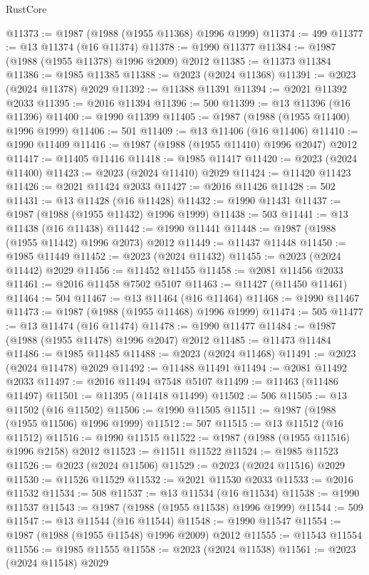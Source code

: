 \begin{lexlean}{RustCore}
\begin{coremodule}
@11373 := @1987 (@1988 (@1955 @11368) @1996 @1999)
@11374 := 499
@11377 := @13 @11374 (@16 @11374)
@11378 := @1990 @11377
@11384 := @1987 (@1988 (@1955 @11378) @1996 @2009) @2012
@11385 := @11373 @11384
@11386 := @1985 @11385
@11388 := @2023 (@2024 @11368)
@11391 := @2023 (@2024 @11378) @2029
@11392 := @11388 @11391
@11394 := @2021 @11392 @2033
@11395 := @2016 @11394
@11396 := 500
@11399 := @13 @11396 (@16 @11396)
@11400 := @1990 @11399
@11405 := @1987 (@1988 (@1955 @11400) @1996 @1999)
@11406 := 501
@11409 := @13 @11406 (@16 @11406)
@11410 := @1990 @11409
@11416 := @1987 (@1988 (@1955 @11410) @1996 @2047) @2012
@11417 := @11405 @11416
@11418 := @1985 @11417
@11420 := @2023 (@2024 @11400)
@11423 := @2023 (@2024 @11410) @2029
@11424 := @11420 @11423
@11426 := @2021 @11424 @2033
@11427 := @2016 @11426
@11428 := 502
@11431 := @13 @11428 (@16 @11428)
@11432 := @1990 @11431
@11437 := @1987 (@1988 (@1955 @11432) @1996 @1999)
@11438 := 503
@11441 := @13 @11438 (@16 @11438)
@11442 := @1990 @11441
@11448 := @1987 (@1988 (@1955 @11442) @1996 @2073) @2012
@11449 := @11437 @11448
@11450 := @1985 @11449
@11452 := @2023 (@2024 @11432)
@11455 := @2023 (@2024 @11442) @2029
@11456 := @11452 @11455
@11458 := @2081 @11456 @2033
@11461 := @2016 @11458 @7502 @5107
@11463 := @11427 (@11450 @11461)
@11464 := 504
@11467 := @13 @11464 (@16 @11464)
@11468 := @1990 @11467
@11473 := @1987 (@1988 (@1955 @11468) @1996 @1999)
@11474 := 505
@11477 := @13 @11474 (@16 @11474)
@11478 := @1990 @11477
@11484 := @1987 (@1988 (@1955 @11478) @1996 @2047) @2012
@11485 := @11473 @11484
@11486 := @1985 @11485
@11488 := @2023 (@2024 @11468)
@11491 := @2023 (@2024 @11478) @2029
@11492 := @11488 @11491
@11494 := @2081 @11492 @2033
@11497 := @2016 @11494 @7548 @5107
@11499 := @11463 (@11486 @11497)
@11501 := @11395 (@11418 @11499)
@11502 := 506
@11505 := @13 @11502 (@16 @11502)
@11506 := @1990 @11505
@11511 := @1987 (@1988 (@1955 @11506) @1996 @1999)
@11512 := 507
@11515 := @13 @11512 (@16 @11512)
@11516 := @1990 @11515
@11522 := @1987 (@1988 (@1955 @11516) @1996 @2158) @2012
@11523 := @11511 @11522
@11524 := @1985 @11523
@11526 := @2023 (@2024 @11506)
@11529 := @2023 (@2024 @11516) @2029
@11530 := @11526 @11529
@11532 := @2021 @11530 @2033
@11533 := @2016 @11532
@11534 := 508
@11537 := @13 @11534 (@16 @11534)
@11538 := @1990 @11537
@11543 := @1987 (@1988 (@1955 @11538) @1996 @1999)
@11544 := 509
@11547 := @13 @11544 (@16 @11544)
@11548 := @1990 @11547
@11554 := @1987 (@1988 (@1955 @11548) @1996 @2009) @2012
@11555 := @11543 @11554
@11556 := @1985 @11555
@11558 := @2023 (@2024 @11538)
@11561 := @2023 (@2024 @11548) @2029

\end{coremodule}
\end{lexlean}

